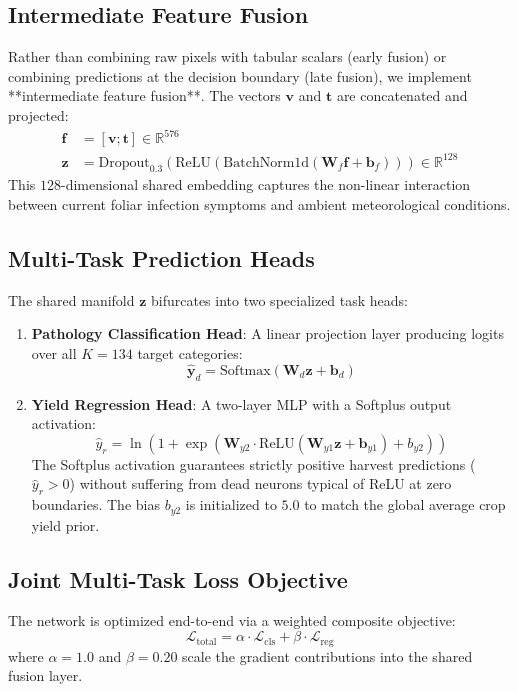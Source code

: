 \documentclass[conference]{IEEEtran}
\begin{document}
\subsection{Intermediate Feature Fusion}
Rather than combining raw pixels with tabular scalars (early fusion) or combining predictions at the decision boundary (late fusion), we implement **intermediate feature fusion**. The vectors $\mathbf{v}$ and $\mathbf{t}$ are concatenated and projected:
\begin{align}
    \mathbf{f} &= [\mathbf{v}; \mathbf{t}] \in \mathbb{R}^{576} \\
    \mathbf{z} &= \text{Dropout}_{0.3}(\text{ReLU}(\text{BatchNorm1d}(\mathbf{W}_f \mathbf{f} + \mathbf{b}_f))) \in \mathbb{R}^{128}
\end{align}
This $128$-dimensional shared embedding captures the non-linear interaction between current foliar infection symptoms and ambient meteorological conditions.

\subsection{Multi-Task Prediction Heads}
The shared manifold $\mathbf{z}$ bifurcates into two specialized task heads:
\begin{enumerate}
    \item \textbf{Pathology Classification Head}: A linear projection layer producing logits over all $K = 134$ target categories:
    \begin{equation}
        \hat{\mathbf{y}}_d = \text{Softmax}(\mathbf{W}_d \mathbf{z} + \mathbf{b}_d)
    \end{equation}
    \item \textbf{Yield Regression Head}: A two-layer MLP with a Softplus output activation:
    \begin{equation}
        \hat{y}_r = \ln(1 + \exp(\mathbf{W}_{y2} \cdot \text{ReLU}(\mathbf{W}_{y1} \mathbf{z} + \mathbf{b}_{y1}) + b_{y2}))
    \end{equation}
    The Softplus activation guarantees strictly positive harvest predictions ($\hat{y}_r > 0$) without suffering from dead neurons typical of ReLU at zero boundaries. The bias $b_{y2}$ is initialized to $5.0$ to match the global average crop yield prior.
\end{enumerate}

\subsection{Joint Multi-Task Loss Objective}
The network is optimized end-to-end via a weighted composite objective:
\begin{equation}
    \mathcal{L}_{\text{total}} = \alpha \cdot \mathcal{L}_{\text{cls}} + \beta \cdot \mathcal{L}_{\text{reg}}
\end{equation}
where $\alpha = 1.0$ and $\beta = 0.20$ scale the gradient contributions into the shared fusion layer.
\end{document}
